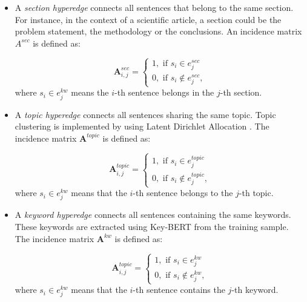 \documentclass[preprint,review,10pt]{elsarticle}
\begin{document}
	\begin{itemize}
		\item A \textit{section hyperedge} connects all sentences that belong to the same section. For instance, in the context of a scientific article, a section could be the problem statement, the methodology or the conclusions. An incidence matrix $A^{sec}$ is defined as:
		
		\begin{equation}
			\mathbf{A}^{sec}_{i,j} =
			\begin{cases}
				1, \text{ if } s_{i} \in e^{sec}_{j} \\
				0, \text{ if } s_{i} \notin e^{sec}_{j},
			\end{cases}
		\end{equation}
		where $s_{i} \in e^{kw}_{j}$ means the $i$-th sentence belongs in the $j$-th section.
		
		\item A \textit{topic hyperedge} connects all sentences sharing the same topic. Topic clustering is implemented by using Latent Dirichlet Allocation \cite{dirichet}. The incidence matrix
		$\mathbf{A}^{topic}$ is defined as:
		
		\begin{equation}
			\mathbf{A}^{topic}_{i,j} =
			\begin{cases}
				1, \text{ if } s_{i} \in e^{topic}_{j} \\
				0, \text{ if } s_{i} \notin e^{topic}_{j},
			\end{cases}
		\end{equation}
		where $s_{i} \in e^{kw}_{j}$ means that the $i$-th sentence belongs to the $j$-th topic.
		
		\item A \textit{keyword hyperedge} connects all sentences containing the same keywords. These keywords are extracted using Key-BERT \cite{keybert} from the training sample. The incidence matrix $\mathbf{A}^{kw}$ is defined as:
		
		\begin{equation}
			\mathbf{A}^{topic}_{i,j} =
			\begin{cases}
				1, \text{ if } s_{i} \in e^{kw}_{j} \\
				0, \text{ if } s_{i} \notin e^{kw}_{j},
			\end{cases}
		\end{equation}
		where $s_{i} \in e^{kw}_{j}$ means that the $i$-th sentence contains the $j$-th keyword.
	\end{itemize}
	
\end{document}
